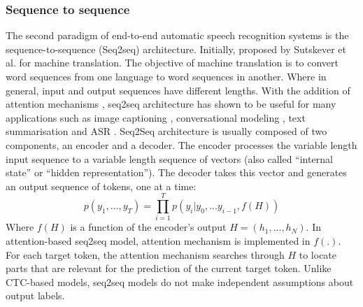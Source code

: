 \subsubsection{Sequence to sequence}
The second paradigm of end-to-end automatic speech recognition systems is the sequence-to-sequence (Seq2seq) architecture. Initially, proposed by Sutskever et al. \cite{sutskever2014sequence} for machine translation. The objective of machine translation is to convert word sequences from one language to word sequences in another. Where in general, input and output sequences have different lengths.
With the addition of attention mechanisms \cite{bahdanau2014neural}, seq2seq architecture has shown to be useful for many applications such as image captioning \cite{seq2seq_imagecaption}, conversational modeling \cite{vinyals2015neural}, text summarisation \cite{nallapati2016abstractive}  and ASR \cite{dong2018speech}.
Seq2Seq architecture is usually composed of two components, an encoder and a decoder. The encoder processes the variable length input sequence to a variable length sequence of vectors (also called ``internal state'' or ``hidden representation''). The decoder takes this vector and generates an output sequence of tokens, one at a time:
\begin{equation}
    p(y_1,...,y_T) = \prod_{i=1}^{T} p(y_i| y_0,...y_{i-1}, f(H))
\end{equation}
Where $f(H)$ is a function of the encoder's output $H = (h_1,...,h_N)$. In attention-based seq2seq model, attention mechanism \cite{bahdanau2014neural} is implemented in $f(.)$. For each target token, the attention mechanism searches through $H$ to locate parts that are relevant for the prediction of the current target token. 
Unlike CTC-based models, seq2seq models do not make independent assumptions about output labels.

